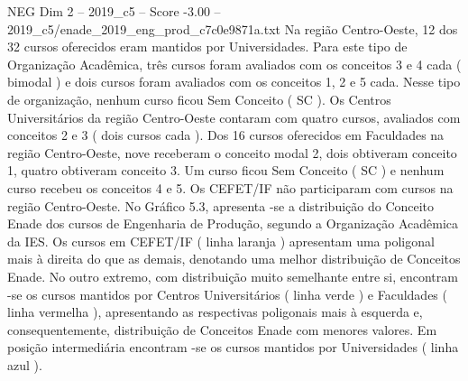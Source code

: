 \begin{textsample}{NEG Dim 2 – 2019\_c5 – Score -3.00 – 2019\_c5/enade\_2019\_eng\_prod\_c7c0e9871a.txt}
Na região Centro-Oeste, 12 dos 32 cursos oferecidos eram mantidos por Universidades.
Para este tipo de Organização Acadêmica, três cursos foram avaliados com os conceitos 3 e 4 cada ( bimodal ) e dois cursos foram avaliados com os conceitos 1, 2 e 5 cada.
Nesse tipo de organização, nenhum curso ficou Sem Conceito ( SC ).
Os Centros Universitários da região Centro-Oeste contaram com quatro cursos, avaliados com conceitos 2 e 3 ( dois cursos cada ).
Dos 16 cursos oferecidos em Faculdades na região Centro-Oeste, nove receberam o conceito modal 2, dois obtiveram conceito 1, quatro obtiveram conceito 3.
Um curso ficou Sem Conceito ( SC ) e nenhum curso recebeu os conceitos 4 e 5.
Os CEFET/IF não participaram com cursos na região Centro-Oeste.
No Gráfico 5.3, apresenta -se a distribuição do Conceito Enade dos cursos de Engenharia de Produção, segundo a Organização Acadêmica da IES.
Os cursos em CEFET/IF ( linha laranja ) apresentam uma poligonal mais à direita do que as demais, denotando uma melhor distribuição de Conceitos Enade.
No outro extremo, com distribuição muito semelhante entre si, encontram -se os cursos mantidos por Centros Universitários ( linha verde ) e Faculdades ( linha vermelha ), apresentando as respectivas poligonais mais à esquerda e, consequentemente, distribuição de Conceitos Enade com menores valores.
Em posição intermediária encontram -se os cursos mantidos por Universidades ( linha azul ).

\end{textsample}
